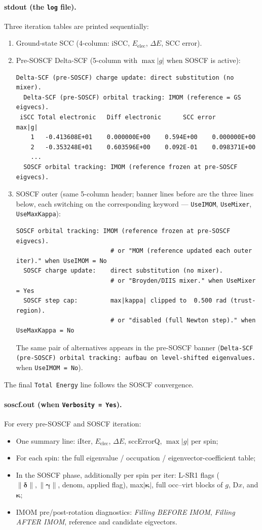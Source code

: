 \documentclass[11pt,a4paper]{article}
\newcommand{\kkappa}{\bm{\kappa}}
\begin{document}
\paragraph{stdout (the \texttt{log} file).}
Three iteration tables are printed sequentially:
\begin{enumerate}
\item Ground-state SCC (4-column: iSCC, $E_\mathrm{elec}$, $\Delta E$, SCC error).
\item Pre-SOSCF Delta-SCF (5-column with $\max|g|$ when SOSCF is active):
\begin{lstlisting}[style=hsd,numbers=none]
  Delta-SCF (pre-SOSCF) charge update: direct substitution (no mixer).
  Delta-SCF (pre-SOSCF) orbital tracking: IMOM (reference = GS eigvecs).
 iSCC Total electronic   Diff electronic      SCC error          max|g|
    1   -0.413608E+01    0.000000E+00    0.594E+00    0.000000E+00
    2   -0.353248E+01    0.603596E+00    0.092E-01    0.098371E+00
    ...
  SOSCF orbital tracking: IMOM (reference frozen at pre-SOSCF eigvecs).
\end{lstlisting}
\item SOSCF outer (same 5-column header; banner lines before are the
three lines below, each switching on the corresponding keyword —
\texttt{UseIMOM}, \texttt{UseMixer}, \texttt{UseMaxKappa}):
\begin{lstlisting}[style=hsd,numbers=none]
  SOSCF orbital tracking: IMOM (reference frozen at pre-SOSCF eigvecs).
                          # or "MOM (reference updated each outer iter)." when UseIMOM = No
  SOSCF charge update:    direct substitution (no mixer).
                          # or "Broyden/DIIS mixer." when UseMixer = Yes
  SOSCF step cap:         max|kappa| clipped to  0.500 rad (trust-region).
                          # or "disabled (full Newton step)." when UseMaxKappa = No
\end{lstlisting}
The same pair of alternatives appears in the pre-SOSCF banner
(\texttt{Delta-SCF (pre-SOSCF) orbital tracking: aufbau on
level-shifted eigenvalues.} when \texttt{UseIMOM = No}).
\end{enumerate}
The final \texttt{Total Energy} line follows the SOSCF convergence.

\paragraph{soscf.out (when \texttt{Verbosity = Yes}).}
For every pre-SOSCF and SOSCF iteration:
\begin{itemize}[leftmargin=*]
\item One summary line: iIter, $E_\mathrm{elec}$, $\Delta E$, sccErrorQ, $\max|g|$ per spin;
\item For each spin: the full eigenvalue / occupation / eigenvector-coefficient table;
\item In the SOSCF phase, additionally per spin per iter: L-SR1 flags
($\|\bm{\delta}\|, \|\bm{\gamma}\|$, denom, applied flag), max$|\kkappa|$,
full occ--virt blocks of $g$, $\mathrm{D}x$, and $\kkappa$;
\item IMOM pre/post-rotation diagnostics: \emph{Filling BEFORE IMOM},
\emph{Filling AFTER IMOM}, reference and candidate eigvectors.
\end{itemize}
\end{document}
